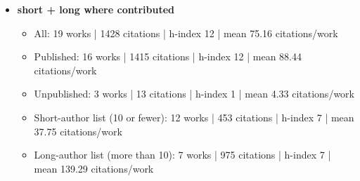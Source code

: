 \begin{itemize}
\begin{itemize}
    \item Long-author list (more than 10): 104 works | 25353 citations | h-index 58 | mean 243.78 citations/work
  \end{itemize}
  \item \textbf{short + long where contributed}
  \begin{itemize}
    \item All: 19 works | 1428 citations | h-index 12 | mean 75.16 citations/work
    \item Published: 16 works | 1415 citations | h-index 12 | mean 88.44 citations/work
    \item Unpublished: 3 works | 13 citations | h-index 1 | mean 4.33 citations/work
    \item Short-author list (10 or fewer): 12 works | 453 citations | h-index 7 | mean 37.75 citations/work
    \item Long-author list (more than 10): 7 works | 975 citations | h-index 7 | mean 139.29 citations/work
  \end{itemize}
\end{itemize}
